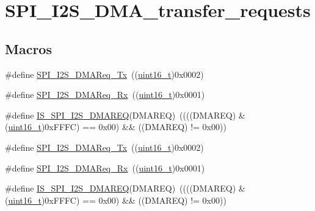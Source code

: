 \hypertarget{group___s_p_i___i2_s___d_m_a__transfer__requests}{}\section{S\+P\+I\+\_\+\+I2\+S\+\_\+\+D\+M\+A\+\_\+transfer\+\_\+requests}
\label{group___s_p_i___i2_s___d_m_a__transfer__requests}
\subsection*{Macros}
\begin{DoxyCompactItemize}
\item 
\#define \hyperlink{group___s_p_i___i2_s___d_m_a__transfer__requests_ga05f55a18c83aaa945d99200d012e5e2a}{S\+P\+I\+\_\+\+I2\+S\+\_\+\+D\+M\+A\+Req\+\_\+\+Tx}~((\hyperlink{_p_e___types_8h_a1f1825b69244eb3ad2c7165ddc99c956}{uint16\+\_\+t})0x0002)
\item 
\#define \hyperlink{group___s_p_i___i2_s___d_m_a__transfer__requests_gaa7f680295cdc1af9b086bf51312f15f3}{S\+P\+I\+\_\+\+I2\+S\+\_\+\+D\+M\+A\+Req\+\_\+\+Rx}~((\hyperlink{_p_e___types_8h_a1f1825b69244eb3ad2c7165ddc99c956}{uint16\+\_\+t})0x0001)
\item 
\#define \hyperlink{group___s_p_i___i2_s___d_m_a__transfer__requests_ga6a8f97093494f2331dbdf9295d7c2c6b}{I\+S\+\_\+\+S\+P\+I\+\_\+\+I2\+S\+\_\+\+D\+M\+A\+R\+EQ}(D\+M\+A\+R\+EQ)~((((D\+M\+A\+R\+EQ) \& (\hyperlink{_p_e___types_8h_a1f1825b69244eb3ad2c7165ddc99c956}{uint16\+\_\+t})0x\+F\+F\+F\+C) == 0x00) \&\& ((\+D\+M\+A\+R\+E\+Q) != 0x00))
\item 
\#define \hyperlink{group___s_p_i___i2_s___d_m_a__transfer__requests_ga05f55a18c83aaa945d99200d012e5e2a}{S\+P\+I\+\_\+\+I2\+S\+\_\+\+D\+M\+A\+Req\+\_\+\+Tx}~((\hyperlink{_p_e___types_8h_a1f1825b69244eb3ad2c7165ddc99c956}{uint16\+\_\+t})0x0002)
\item 
\#define \hyperlink{group___s_p_i___i2_s___d_m_a__transfer__requests_gaa7f680295cdc1af9b086bf51312f15f3}{S\+P\+I\+\_\+\+I2\+S\+\_\+\+D\+M\+A\+Req\+\_\+\+Rx}~((\hyperlink{_p_e___types_8h_a1f1825b69244eb3ad2c7165ddc99c956}{uint16\+\_\+t})0x0001)
\item 
\#define \hyperlink{group___s_p_i___i2_s___d_m_a__transfer__requests_ga6a8f97093494f2331dbdf9295d7c2c6b}{I\+S\+\_\+\+S\+P\+I\+\_\+\+I2\+S\+\_\+\+D\+M\+A\+R\+EQ}(D\+M\+A\+R\+EQ)~((((D\+M\+A\+R\+EQ) \& (\hyperlink{_p_e___types_8h_a1f1825b69244eb3ad2c7165ddc99c956}{uint16\+\_\+t})0x\+F\+F\+F\+C) == 0x00) \&\& ((\+D\+M\+A\+R\+E\+Q) != 0x00))
\end{DoxyCompactItemize}


